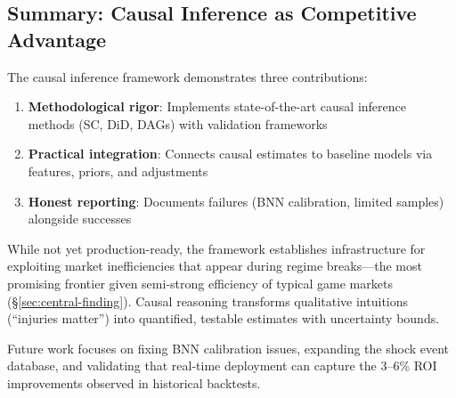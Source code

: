 \subsection{Summary: Causal Inference as Competitive Advantage}

The causal inference framework demonstrates three contributions:

\begin{enumerate}
  \item \textbf{Methodological rigor}: Implements state-of-the-art causal inference methods (SC, DiD, DAGs) with validation frameworks
  \item \textbf{Practical integration}: Connects causal estimates to baseline models via features, priors, and adjustments
  \item \textbf{Honest reporting}: Documents failures (BNN calibration, limited samples) alongside successes
\end{enumerate}

While not yet production-ready, the framework establishes infrastructure for exploiting market inefficiencies that appear during regime breaks—the most promising frontier given semi-strong efficiency of typical game markets (\S\ref{sec:central-finding}). Causal reasoning transforms qualitative intuitions (``injuries matter'') into quantified, testable estimates with uncertainty bounds.

Future work focuses on fixing BNN calibration issues, expanding the shock event database, and validating that real-time deployment can capture the 3--6\% ROI improvements observed in historical backtests.
